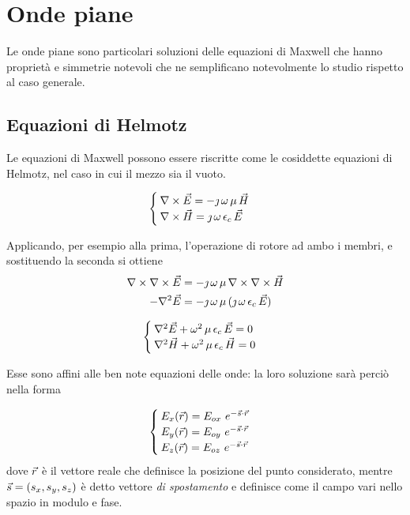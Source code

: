 \chapter{Onde piane}
Le onde piane sono particolari soluzioni delle equazioni di Maxwell che hanno proprietà e simmetrie notevoli che ne semplificano notevolmente lo studio rispetto al caso generale.

\section{Equazioni di Helmotz}
	Le equazioni di Maxwell possono essere riscritte come le cosiddette equazioni di Helmotz, nel caso in cui il mezzo sia il vuoto.

	\begin{equation*}
		\begin{cases}
			\nabla\times\vec{E} = - \jmath \, \omega \, \mu \, \vec{H} \\
			\nabla\times\vec{H} = \jmath \, \omega \, \epsilon_c \, \vec{E} \\
		\end{cases}
	\end{equation*}

	Applicando, per esempio alla prima, l'operazione di rotore ad ambo i membri, e sostituendo la seconda si ottiene
	\begin{equation*}
		\begin{split}
			\nabla\times\nabla\times\vec{E} &= - \jmath \, \omega \, \mu \, \nabla\times \nabla\times\vec{H} \\
			- \nabla^2\vec{E} &= - \jmath \, \omega \, \mu \, (\jmath \, \omega \, \epsilon_c \, \vec{E})\\
		\end{split}
	\end{equation*}

	\begin{equation} \label{eq:helmotz}
		\begin{cases}
			\nabla^2 \vec{E} + \omega^2 \, \mu \, \epsilon_c \, \vec{E} = 0 \\
			\nabla^2 \vec{H} + \omega^2 \, \mu \, \epsilon_c \, \vec{H} = 0
		\end{cases}
	\end{equation}

	Esse sono affini alle ben note equazioni delle onde: la loro soluzione sarà perciò nella forma

	\begin{equation} \label{eq:helmotz_sol}
		\begin{cases}
			E_x(\vec{r}) = E_{ox} ~ e^{-\vec{s} \cdot \vec{r}} \\
			E_y(\vec{r}) = E_{oy} ~ e^{-\vec{s} \cdot \vec{r}} \\
			E_z(\vec{r}) = E_{oz} ~ e^{-\vec{s} \cdot \vec{r}}
		\end{cases}
	\end{equation}
	dove $\vec{r}$ è il vettore reale che definisce la posizione del punto considerato, mentre $\vec{s} = (s_x, s_y, s_z)$ è detto vettore \emph{di spostamento} e definisce come il campo vari nello spazio in modulo e fase.


